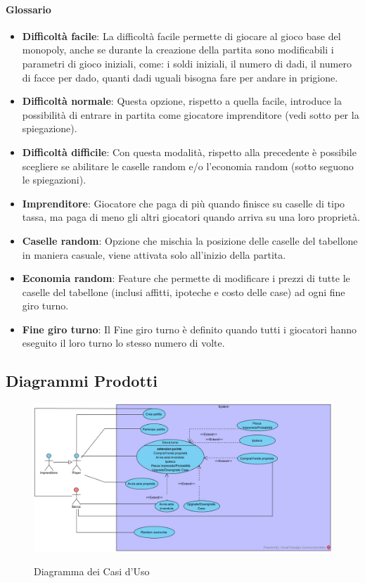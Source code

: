 \documentclass{article}
\begin{document}
\paragraph{\large Glossario}
\begin{itemize}
  \item \textbf{Difficoltà facile}: La difficoltà facile permette di giocare al gioco base del monopoly, anche se durante la creazione della partita sono modificabili i parametri di gioco iniziali, come: i soldi iniziali, il numero di dadi, il numero di facce per dado, quanti dadi uguali bisogna fare per andare in prigione.
  \item \textbf{Difficoltà normale}:  Questa opzione, rispetto a quella facile, introduce la possibilità di entrare in partita come giocatore imprenditore (vedi sotto per la spiegazione).
  \item \textbf{Difficoltà difficile}:  Con questa modalità, rispetto alla precedente è possibile scegliere se abilitare le caselle random e/o l'economia random (sotto seguono le spiegazioni).
  
  \item \textbf{Imprenditore}: Giocatore che paga di più quando finisce su caselle di tipo tassa, ma paga di meno gli altri giocatori quando arriva su una loro proprietà.
  \item \textbf{Caselle random}: Opzione che mischia la posizione delle caselle del tabellone in maniera casuale, viene attivata solo all'inizio della partita.
  \item \textbf{Economia random}: Feature che permette di modificare i prezzi di tutte le caselle del tabellone (inclusi affitti, ipoteche e costo delle case) ad ogni fine giro turno.
  \item \textbf{Fine giro turno}: Il Fine giro turno è definito quando tutti i giocatori hanno eseguito il loro turno lo stesso numero di volte.
   
 \end{itemize}
\subsection{Diagrammi Prodotti}

	\begin{figure}[H]
	\centering
\href{https://github.com/UnimibSoftEngCourse2022/progetto-monopoly-1-gangoffour2/blob/feat/doc/doc/img/ModelloCasiDUso.jpg?raw=true}
	{\includegraphics[width=\textwidth]{ModelloCasiDUso}}
	\caption{Diagramma dei Casi d'Uso}
	\end{figure}
	
\end{document}

